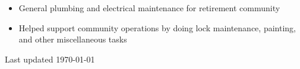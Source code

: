 \begin{paracol}{2}
{
\begin{itemize}
  \item General plumbing and electrical maintenance for retirement community
  \item Helped support community operations by doing lock maintenance, painting, and other miscellaneous tasks
\end{itemize}

}


\normaltext \hfill \tiny Last updated \today

\end{paracol}


